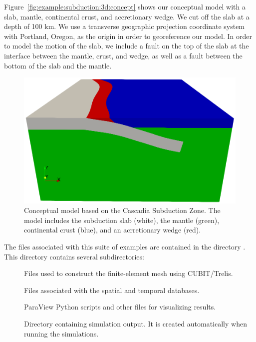Figure~\vref{fig:example:subduction:3d:concept} shows our conceptual
model with a slab, mantle, continental crust, and accretionary
wedge. We cut off the slab at a depth of 100 km. We use a transverse
geographic projection coordinate system with Portland, Oregon, as the
origin in order to georeference our model. In order to model the
motion of the slab, we include a fault on the top of the slab at the
interface between the mantle, crust, and wedge, as well as a fault
between the bottom of the slab and the mantle.

\begin{figure}[htbp]
  \includegraphics[width=4.5in]{examples/figs/subduction3d_conceptualmodel}
  \caption{Conceptual model based on the Cascadia Subduction Zone. The
    model includes the subduction slab (white), the mantle (green),
    continental crust (blue), and an acrretionary wedge (red).}
  \label{fig:example:subduction:3d:concept}
\end{figure}

The files associated with this suite of examples are contained in the
directory . This directory contains
several subdirectories:
\begin{description}
\item[] Files used to construct the finite-element mesh using
  CUBIT/Trelis.
\item[] Files associated with the spatial
  and temporal databases.
\item[] ParaView
  Python scripts and other files for visualizing results.
\item[] Directory containing simulation
  output. It is created automatically when running the
  simulations.
\end{description}


